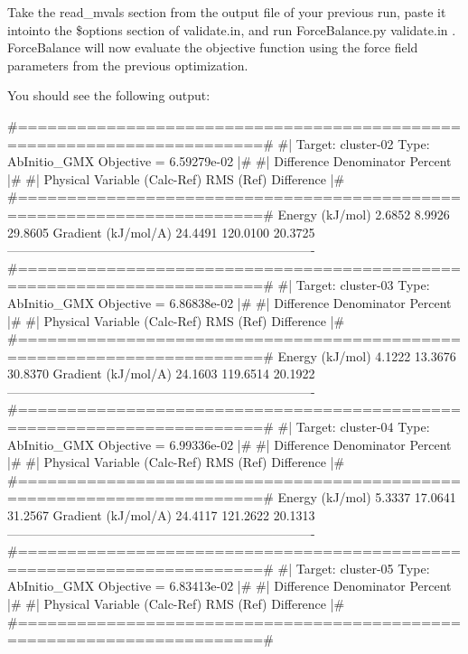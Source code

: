 Take the {\ttfamily read\-\_\-mvals} section from the output file of your previous run, paste it intointo the {\ttfamily \$options} section of {\ttfamily validate.\-in}, and run {\ttfamily Force\-Balance.\-py validate.\-in} . Force\-Balance will now evaluate the objective function using the force field parameters from the previous optimization.

You should see the following output\-:

\begin{DoxyVerb}#=======================================================================#
#|  Target: cluster-02 Type: AbInitio_GMX Objective = 6.59279e-02      |#
#|                              Difference   Denominator     Percent   |#
#|  Physical Variable           (Calc-Ref)     RMS (Ref)   Difference  |#
#=======================================================================#
    Energy (kJ/mol)                 2.6852        8.9926     29.8605%
    Gradient (kJ/mol/A)            24.4491      120.0100     20.3725%
-------------------------------------------------------------------------
#=======================================================================#
#|  Target: cluster-03 Type: AbInitio_GMX Objective = 6.86838e-02      |#
#|                              Difference   Denominator     Percent   |#
#|  Physical Variable           (Calc-Ref)     RMS (Ref)   Difference  |#
#=======================================================================#
    Energy (kJ/mol)                 4.1222       13.3676     30.8370%
    Gradient (kJ/mol/A)            24.1603      119.6514     20.1922%
-------------------------------------------------------------------------
#=======================================================================#
#|  Target: cluster-04 Type: AbInitio_GMX Objective = 6.99336e-02      |#
#|                              Difference   Denominator     Percent   |#
#|  Physical Variable           (Calc-Ref)     RMS (Ref)   Difference  |#
#=======================================================================#
    Energy (kJ/mol)                 5.3337       17.0641     31.2567%
    Gradient (kJ/mol/A)            24.4117      121.2622     20.1313%
-------------------------------------------------------------------------
#=======================================================================#
#|  Target: cluster-05 Type: AbInitio_GMX Objective = 6.83413e-02      |#
#|                              Difference   Denominator     Percent   |#
#|  Physical Variable           (Calc-Ref)     RMS (Ref)   Difference  |#
#=======================================================================#

\end{DoxyVerb}
